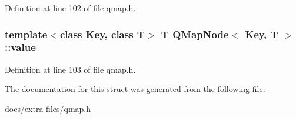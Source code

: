 Definition at line 102 of file qmap.\+h.

\subsubsection[{\texorpdfstring{value}{value}}]{\setlength{\rightskip}{0pt plus 5cm}template$<$class Key, class T$>$ T {\bf Q\+Map\+Node}$<$ Key, T $>$\+::value}\hypertarget{struct_q_map_node_a872bc4a284250baed9e3dc22b8e39692}{}\label{struct_q_map_node_a872bc4a284250baed9e3dc22b8e39692}


Definition at line 103 of file qmap.\+h.



The documentation for this struct was generated from the following file\+:\begin{DoxyCompactItemize}
\item 
docs/extra-\/files/\hyperlink{qmap_8h}{qmap.\+h}\end{DoxyCompactItemize}
